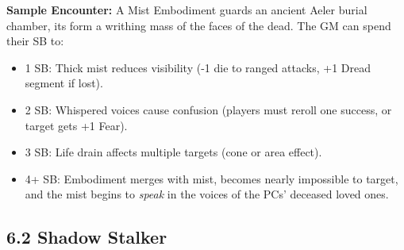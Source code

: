 \documentclass[11pt]{article}
\begin{document}
\textbf{Sample Encounter:} A Mist Embodiment guards an ancient Aeler burial chamber, its form a writhing mass of the faces of the dead. The GM can spend their SB to:
\begin{itemize}
\item 1 SB: Thick mist reduces visibility (-1 die to ranged attacks, +1 Dread segment if lost).
\item 2 SB: Whispered voices cause confusion (players must reroll one success, or target gets +1 Fear).
\item 3 SB: Life drain affects multiple targets (cone or area effect).
\item 4+ SB: Embodiment merges with mist, becomes nearly impossible to target, and the mist begins to \textit{speak} in the voices of the PCs' deceased loved ones.
\end{itemize}

\clearpage

\subsection*{6.2 Shadow Stalker}
\end{document}
